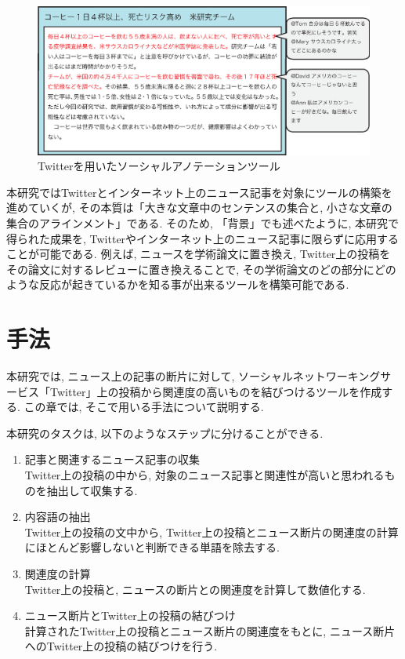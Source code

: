 \documentclass[12pt]{jarticle}
\begin{document}
\begin{figure}[htbp]
  \begin{center}
    \includegraphics{ai/social_annotation.eps}
  \end{center}
  \caption{Twitterを用いたソーシャルアノテーションツール}
  \label{fig1}
\end{figure}

本研究ではTwitterとインターネット上のニュース記事を対象にツールの構築を進めていくが, その本質は「大きな文章中のセンテンスの集合と, 小さな文章の集合のアラインメント」である. そのため, 「背景」でも述べたように, 本研究で得られた成果を, Twitterやインターネット上のニュース記事に限らずに応用することが可能である. 例えば, ニュースを学術論文に置き換え, Twitter上の投稿をその論文に対するレビューに置き換えることで, その学術論文のどの部分にどのような反応が起きているかを知る事が出来るツールを構築可能である. 

\newpage

\section{手法}
本研究では, ニュース上の記事の断片に対して, ソーシャルネットワーキングサービス「Twitter」上の投稿から関連度の高いものを結びつけるツールを作成する. この章では, そこで用いる手法について説明する. 

本研究のタスクは, 以下のようなステップに分けることができる. 

\begin{enumerate}
  \item 記事と関連するニュース記事の収集\\
    Twitter上の投稿の中から, 対象のニュース記事と関連性が高いと思われるものを抽出して収集する. 
  \item 内容語の抽出\\
    Twitter上の投稿の文中から, Twitter上の投稿とニュース断片の関連度の計算にほとんど影響しないと判断できる単語を除去する. 
  \item 関連度の計算\\
    Twitter上の投稿と, ニュースの断片との関連度を計算して数値化する. 
  \item ニュース断片とTwitter上の投稿の結びつけ\\
    計算されたTwitter上の投稿とニュース断片の関連度をもとに, ニュース断片へのTwitter上の投稿の結びつけを行う. 
\end{enumerate}
\end{document}
